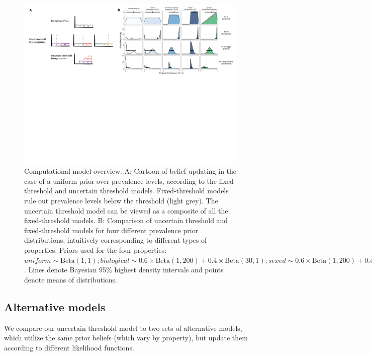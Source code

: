 \documentclass[floatsintext,doc]{apa6}
\begin{document}
\begin{figure}
\centering
\includegraphics{figs/cartoon-model-sims}
\caption{\label{fig:modelSimulations}
Computational model overview.
A: Cartoon of belief updating in the case of a uniform prior over prevalence levels, according to the fixed-threshold and uncertain threshold models. Fixed-threshold models rule out prevalence levels below the threshold (light grey). The uncertain threshold model can be viewed as a composite of all the fixed-threshold models.
B: Comparison of uncertain threshold and fixed-threshold models for four different prevalence prior distributions, intuitively corresponding to different types of properties. Priors used for the four properties: $\textit{uniform} \sim \text{Beta}(1, 1); \textit{biological} \sim 0.6 \times \text{Beta}(1, 200) + 0.4 \times \text{Beta}(30, 1); \textit{sexed} \sim 0.6 \times \text{Beta}(1, 200) + 0.4 \times \text{Beta}(10, 10); \textit{accidental} \sim 0.6 \times \text{Beta}(1, 200) + 0.4 \times \text{Beta}(2, 10)$. Lines denote Bayesian 95\% highest density intervals and points denote means of distributions.
}
\end{figure}


\hypertarget{alternative-semantic-models}{%
\subsection{Alternative models}\label{alternative-semantic-models}}

We compare our uncertain threshold model to two sets of alternative models, which utilize the same prior beliefs (which vary by property), but update them according to different likelihood functions. 
\end{document}
